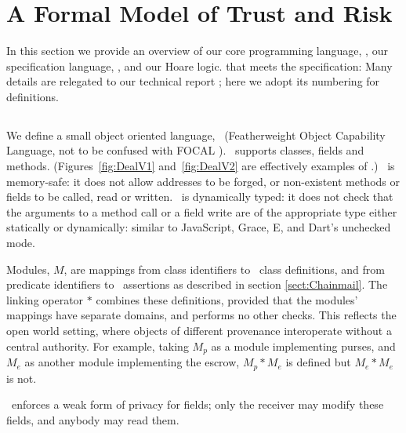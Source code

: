 \section{A Formal Model of Trust and Risk}
\label{section:formal}
 
In this section we provide an overview of our core programming
language, \LangOO, our specification language, \Chainmail, and our
Hoare logic. 
 that
 meets the  specification:
  Many
details are relegated to our technical report \cite{appendix}; here we
adopt its numbering for definitions.




\subsection{\LangOO}

We define a small object oriented language, \LangOO\ 
(Featherweight Object Capability Language, not to be confused
with FOCAL \cite{FOCAL-69}). \LangOO\ 
 supports classes, fields and methods.
(Figures~\ref{fig:DealV1} and~\ref{fig:DealV2} are effectively examples of \LangOO.)
%
\LangOO\ is  memory-safe: it does not allow
addresses to be forged, or non-existent methods or fields to be
called, read or written.   \LangOO\ is dynamically typed: it does not check
that the arguments to a method call or a field write are of the
appropriate type either statically or dynamically: similar to 
JavaScript, Grace, E, and Dart's unchecked mode.
 

Modules, $M$,  are  mappings from class
identifiers to \LangOO\ class definitions, and from predicate identifiers to \Chainmail\ assertions as described in section \ref{sect:Chainmail}.
The  linking operator $*$ combines these definitions, provided that 
the modules' mappings have separate domains, and performs no other checks. 
This reflects the open world setting,
where objects of different provenance interoperate without a central
authority.
For example, taking $M_{p}$ as a module implementing purses, and $M_e$
as another module implementing the escrow,
$M_{p}*M_e$ is defined but $M_{e}*M_e$ is not.

\LangOO\  enforces a weak form of privacy for fields; %
only the receiver may modify these fields,  and anybody may read them.

